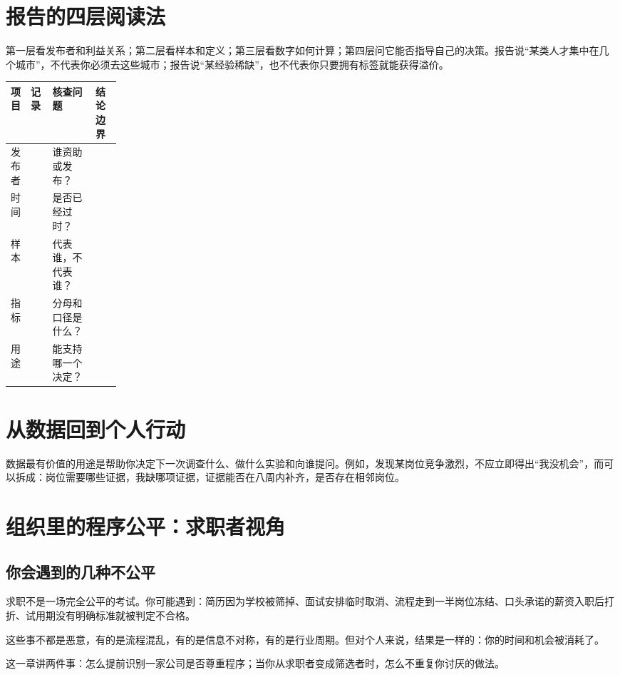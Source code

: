 \documentclass[UTF8,zihao=5,openany]{ctexbook}
\begin{document}
\section{报告的四层阅读法}
第一层看发布者和利益关系；第二层看样本和定义；第三层看数字如何计算；第四层问它能否指导自己的决策。报告说“某类人才集中在几个城市”，不代表你必须去这些城市；报告说“某经验稀缺”，也不代表你只要拥有标签就能获得溢价。

\begin{toolbox}
\begin{center}\small
\begin{tabularx}{0.92\linewidth}{p{0.18\linewidth}YYY}
\toprule
项目 & 记录 & 核查问题 & 结论边界 \\
\midrule
发布者 & & 谁资助或发布？ & \\
时间 & & 是否已经过时？ & \\
样本 & & 代表谁，不代表谁？ & \\
指标 & & 分母和口径是什么？ & \\
用途 & & 能支持哪一个决定？ & \\
\bottomrule
\end{tabularx}
\end{center}
\end{toolbox}

\section{从数据回到个人行动}
数据最有价值的用途是帮助你决定下一次调查什么、做什么实验和向谁提问。例如，发现某岗位竞争激烈，不应立即得出“我没机会”，而可以拆成：岗位需要哪些证据，我缺哪项证据，证据能否在八周内补齐，是否存在相邻岗位。

\section{组织里的程序公平：求职者视角}
\subsection{你会遇到的几种不公平}
求职不是一场完全公平的考试。你可能遇到：简历因为学校被筛掉、面试安排临时取消、流程走到一半岗位冻结、口头承诺的薪资入职后打折、试用期没有明确标准就被判定不合格。

这些事不都是恶意，有的是流程混乱，有的是信息不对称，有的是行业周期。但对个人来说，结果是一样的：你的时间和机会被消耗了。

这一章讲两件事：怎么提前识别一家公司是否尊重程序；当你从求职者变成筛选者时，怎么不重复你讨厌的做法。
\end{document}
